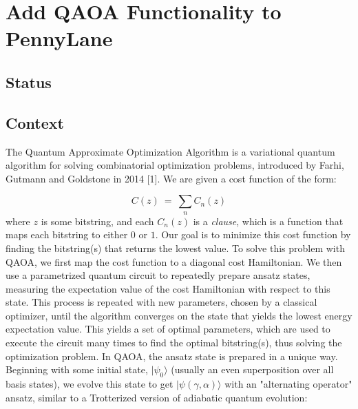 \documentclass{article}
\begin{document}
\section{Add QAOA Functionality to PennyLane}

\subsection{Status}

\subsection{Context}

The Quantum Approximate Optimization Algorithm is a variational quantum algorithm for solving combinatorial 
optimization problems, introduced by Farhi, Gutmann and Goldstone in 2014 [1].
\newline\newline
\noindent
We are given a cost function of the form:

\begin{equation}
	C(z) \ = \ \displaystyle\sum_{n} C_n(z)
\end{equation}
\noindent
where $z$ is some bitstring, and each $C_n(z)$ is a \textit{clause}, which is a function that maps 
each bitstring to either $0$ or $1$. Our goal is to minimize this cost function by finding the 
bitstring(s) that returns the lowest value.
\newline\newline
\noindent
To solve this problem with QAOA, we first map the cost function 
to a diagonal cost Hamiltonian. We then use a parametrized quantum circuit to repeatedly prepare ansatz states, 
measuring the expectation value of the cost Hamiltonian with respect to this state. This process is repeated with 
new parameters, chosen by a classical optimizer, until the algorithm converges on the state that yields the lowest 
energy expectation value. This yields a set of optimal parameters, which are used to execute the circuit many times to 
find the optimal bitstring(s), thus solving the optimization problem.
\newline\newline
\noindent
In QAOA, the ansatz state is prepared in a unique way. Beginning with some initial state, $|\psi_0\rangle$ (usually an 
even superposition over all basis states), we evolve this state to get $|\psi(\gamma, \alpha)\rangle$ with an 
"alternating operator" ansatz, similar to a Trotterized version of adiabatic quantum evolution:
\end{document}
